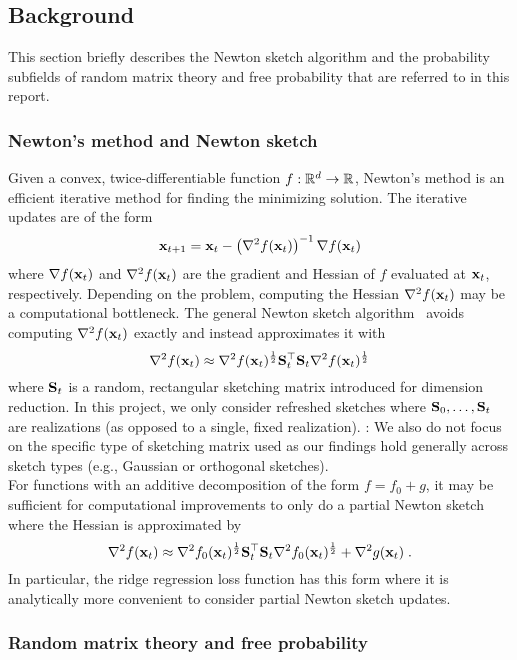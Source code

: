 \subsection{Background} \label{sec:background}

This section briefly describes the Newton sketch algorithm and the probability subfields of random matrix theory and free probability that are referred to in this report.

\subsubsection{Newton's method and Newton sketch} \label{sec:newton}

Given a convex, twice-differentiable function $f:\mathbb{R}^d\rightarrow\mathbb{R}$, Newton's method is an efficient iterative method for finding the minimizing solution. The iterative updates are of the form
\[
\mathbf{x}_{t+1} = \mathbf{x}_t - \left(\nabla^2f(\mathbf{x}_t)\right)^{-1}\nabla f(\mathbf{x}_t)
\]
where $\nabla f(\mathbf{x}_t)$ and $\nabla^2f(\mathbf{x}_t)$ are the gradient and Hessian of $f$ evaluated at $\mathbf{x}_t$, respectively. Depending on the problem, computing the Hessian $\nabla^2f(\mathbf{x}_t)$ may be a computational bottleneck. The general Newton sketch algorithm~\citep{Pilanci:2017} avoids computing $\nabla^2f(\mathbf{x}_t)$ exactly and instead approximates it with
\[
\nabla^2f(\mathbf{x}_t) \approx \nabla^2f(\mathbf{x}_t)^\frac{1}{2}\mathbf{S}_t^\top\mathbf{S}_t\nabla^2f(\mathbf{x}_t)^\frac{1}{2}
\]
where $\mathbf{S}_t$ is a random, rectangular sketching matrix introduced for dimension reduction. In this project, we only consider refreshed sketches where $\mathbf{S}_0,\ldots,\mathbf{S}_t$ are \iid realizations (as opposed to a single, fixed realization). \todo: We also do not focus on the specific type of sketching matrix used as our findings hold generally across sketch types (e.g., \iid Gaussian or orthogonal sketches).
\\

For functions with an additive decomposition of the form $f=f_0+g$, it may be sufficient for computational improvements to only do a partial Newton sketch~\citep{Pilanci:2017} where the Hessian is approximated by
\[
\nabla^2f(\mathbf{x}_t) \approx \nabla^2f_0(\mathbf{x}_t)^\frac{1}{2}\mathbf{S}_t^\top\mathbf{S}_t\nabla^2f_0(\mathbf{x}_t)^\frac{1}{2} + \nabla^2g(\mathbf{x}_t) \;.
\]
In particular, the ridge regression loss function has this form where it is analytically more convenient to consider partial Newton sketch updates.

\subsubsection{Random matrix theory and free probability}

